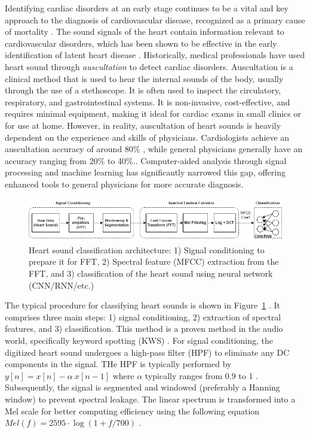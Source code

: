 \documentclass[12pt]{article}
\begin{document}
Identifying cardiac disorders at an early stage continues to be a vital and key approach to the diagnosis of cardiovascular disease, recognized as a primary cause of mortality \cite{members2016heart}.  
The sound signals of the heart contain information relevant to cardiovascular disorders, which has been shown to be effective in the early identification of latent heart disease \cite{yuenyong2011framework}. Historically, medical professionals have used heart sound through \textit{auscultation} to detect cardiac disorders.
Auscultation is a clinical method that is used to hear the internal sounds of the body, usually through the use of a stethoscope. It is often used to inspect the circulatory, respiratory, and gastrointestinal systems.
It is non-invasive, cost-effective, and requires minimal equipment, making it ideal for cardiac exams in small clinics or for use at home.
However, in reality, auscultation of heart sounds is heavily dependent on the experience and skills of physicians.
Cardiologists achieve an auscultation accuracy of around 80\% \cite{strunic2007detection}, while general physicians generally have an accuracy ranging from 20\% to 40\%.\cite{lam2018factors}. Computer-aided analysis through signal processing and machine learning has significantly narrowed this gap, offering enhanced tools to general physicians for more accurate diagnosis.

\begin{figure}[htbp]	
    \includegraphics[width=1.0\textwidth]{figs/HSC-arch.png}
    \caption{Heart sound classification architecture: 1) Signal conditioning to prepare it for FFT, 2) Spectral feature (MFCC) extraction from the FFT, and 3) classification of the heart sound using neural network (CNN/RNN/etc.)}
    \label{fig:arch-heart-sound}
\end{figure}

The typical procedure for classifying heart sounds is shown in Figure~\ref{fig:arch-heart-sound} \cite{gupta2007neural, nguyen2023heart}. It comprises three main steps: 1) signal conditioning, 2) extraction of spectral features, and 3) classification. This method is a proven method in the audio world, specifically keyword spotting (KWS) \cite{chong20220}. For signal conditioning, the digitized heart sound undergoes a high-pass filter (HPF) to eliminate any DC components in the signal. THe HPF is typically performed by $y[n] = x[n] - \alpha~x[n-1]$ where $\alpha$ typically ranges from 0.9 to 1 \cite{han2006efficient}. Subsequently, the signal is segmented and windowed (preferably a Hanning window) to prevent spectral leakage.  The linear spectrum is transformed into a Mel scale for better computing efficiency using the following equation $Mel(f) = 2595\cdot \log(1 + f/700)$ \cite{han2006efficient}.
\end{document}
